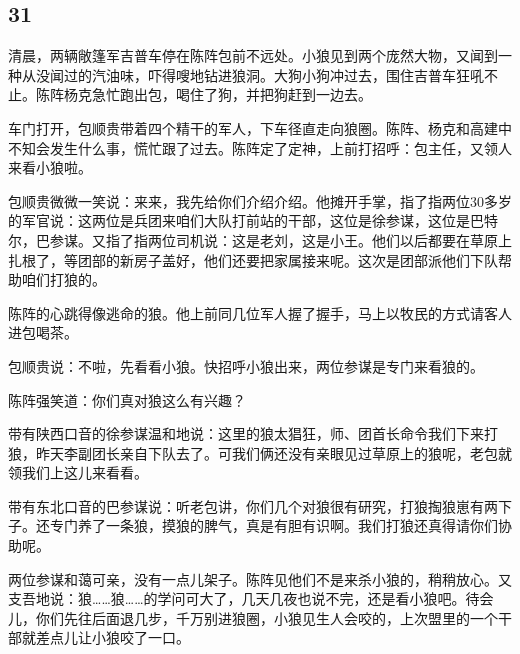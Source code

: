 \subsection*{31}



\par 清晨，两辆敞篷军吉普车停在陈阵包前不远处。小狼见到两个庞然大物，又闻到一种从没闻过的汽油味，吓得嗖地钻进狼洞。大狗小狗冲过去，围住吉普车狂吼不止。陈阵杨克急忙跑出包，喝住了狗，并把狗赶到一边去。
\par 车门打开，包顺贵带着四个精干的军人，下车径直走向狼圈。陈阵、杨克和高建中不知会发生什么事，慌忙跟了过去。陈阵定了定神，上前打招呼：包主任，又领人来看小狼啦。
\par 包顺贵微微一笑说：来来，我先给你们介绍介绍。他摊开手掌，指了指两位30多岁的军官说：这两位是兵团来咱们大队打前站的干部，这位是徐参谋，这位是巴特尔，巴参谋。又指了指两位司机说：这是老刘，这是小王。他们以后都要在草原上扎根了，等团部的新房子盖好，他们还要把家属接来呢。这次是团部派他们下队帮助咱们打狼的。
\par 陈阵的心跳得像逃命的狼。他上前同几位军人握了握手，马上以牧民的方式请客人进包喝茶。
\par 包顺贵说：不啦，先看看小狼。快招呼小狼出来，两位参谋是专门来看狼的。
\par 陈阵强笑道：你们真对狼这么有兴趣？
\par 带有陕西口音的徐参谋温和地说：这里的狼太猖狂，师、团首长命令我们下来打狼，昨天李副团长亲自下队去了。可我们俩还没有亲眼见过草原上的狼呢，老包就领我们上这儿来看看。
\par 带有东北口音的巴参谋说：听老包讲，你们几个对狼很有研究，打狼掏狼崽有两下子。还专门养了一条狼，摸狼的脾气，真是有胆有识啊。我们打狼还真得请你们协助呢。
\par 两位参谋和蔼可亲，没有一点儿架子。陈阵见他们不是来杀小狼的，稍稍放心。又支吾地说：狼……狼……的学问可大了，几天几夜也说不完，还是看小狼吧。待会儿，你们先往后面退几步，千万别进狼圈，小狼见生人会咬的，上次盟里的一个干部就差点儿让小狼咬了一口。
